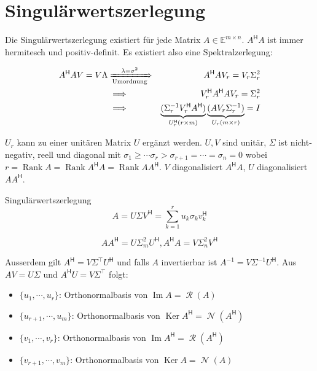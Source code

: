 \documentclass[a4paper,10pt]{article}
\DeclareMathOperator{\Rank}{Rank}
\DeclareMathOperator{\Image}{Im}
\DeclareMathOperator{\Columnspace}{\mathcal{R}}
\DeclareMathOperator{\Nullspace}{\mathcal{N}}
\DeclareMathOperator{\Kernel}{Ker}
\newcommand*{\hermconj}{\mathsf{H}}
\def\E{\mathbb{E}}
\begin{document}
\section{Singulärwertszerlegung}

Die Singulärwertszerlegung existiert für jede Matrix $A \in \E^{m \times n}$. $A^\hermconj A$ ist immer hermitesch und positiv-definit. Es existiert also eine Spektralzerlegung:

\begin{align*}
  A^\hermconj A V = V \Lambda & \xRightarrow[\text{Umordnung}]{\lambda = \sigma^2} & A^\hermconj A V_r = V_r \Sigma_r^2\\
  & \implies & V_r^\hermconj A^\hermconj A V_r = \Sigma_r^2\\
  & \implies & \underbrace{(\Sigma_r^{-1} V_r^\hermconj A^\hermconj)}_{U_r^\hermconj (r \times m)} \underbrace{(A V_r \Sigma_r^{-1})}_{U_r (m \times r)} = I\\
\end{align*}

$U_r$ kann zu einer unitären Matrix $U$ ergänzt werden. $U, V$ sind unitär, $\Sigma$ ist nicht-negativ, reell und diagonal mit $\sigma_1 \geq \cdots \sigma_r > \sigma_{r+1} = \cdots = \sigma_n = 0$ wobei $r = \Rank A = \Rank A^\hermconj A = \Rank A A^\hermconj$. $V$ diagonalisiert $A^\hermconj A$, $U$ diagonalisiert $A A^\hermconj$.

\begin{mainbox}{Singulärwertszerlegung}
  $$A = U \Sigma V^\hermconj = \sum_{k=1}^r u_k \sigma_k v_k^\hermconj$$
\end{mainbox}

$$AA^\hermconj = U \Sigma_m^2 U^\hermconj, A^\hermconj A = V \Sigma_n^2 V^\hermconj$$

Ausserdem gilt $A^\hermconj = V \Sigma^\top U^\hermconj$ und falls $A$ invertierbar ist $A^{-1} = V \Sigma^{-1} U^\hermconj$. Aus $AV = U \Sigma$ und $A^\hermconj U = V \Sigma^\top$ folgt:

\begin{itemize}
  \item $\{u_1, \cdots, u_r\}$: Orthonormalbasis von $\Image A = \Columnspace(A)$
  \item $\{u_{r+1}, \cdots, u_m\}$: Orthonormalbasis von $\Kernel A^\hermconj = \Nullspace(A^\hermconj)$
  \item $\{v_1, \cdots, v_r\}$: Orthonormalbasis von $\Image A^\hermconj = \Columnspace(A^\hermconj)$
  \item $\{v_{r+1}, \cdots, v_m\}$: Orthonormalbasis von $\Kernel A = \Nullspace(A)$
\end{itemize}
\end{document}
